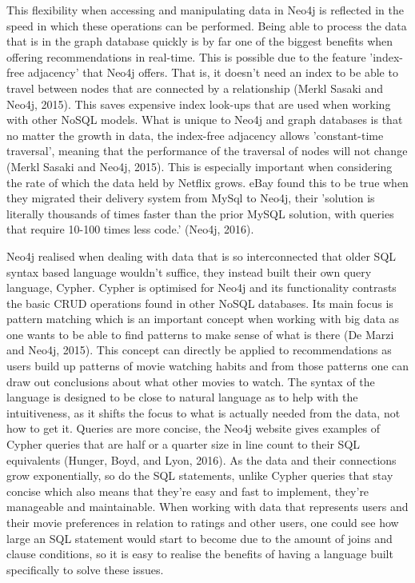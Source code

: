 \documentclass[a4paper]{article}
\begin{document}
This flexibility when accessing and manipulating data in Neo4j is reflected in the speed in which these operations can be performed. Being able to process the data that is in the graph database quickly is by far one of the biggest benefits when offering recommendations in real-time. This is possible due to the feature 'index-free adjacency' that Neo4j offers. That is, it doesn't need an index to be able to travel between nodes that are connected by a relationship (Merkl Sasaki and Neo4j, 2015). This saves expensive index look-ups that are used when working with other NoSQL models. What is unique to Neo4j and graph databases is that no matter the growth in data, the index-free adjacency allows 'constant-time traversal', meaning that the performance of the traversal of nodes will not change (Merkl Sasaki and Neo4j, 2015). This is especially important when considering the rate of which the data held by Netflix grows. eBay found this to be true when they migrated their delivery system from MySql to Neo4j, their 'solution is literally thousands of times faster than the prior MySQL solution, with queries that require 10-100 times less code.' (Neo4j, 2016). \par

Neo4j realised when dealing with data that is so interconnected that older SQL syntax based language wouldn't suffice, they instead built their own query language, Cypher. Cypher is optimised for Neo4j and its functionality contrasts the basic CRUD operations found in other NoSQL databases. Its main focus is pattern matching which is an important concept when working with big data as one wants to be able to find patterns to make sense of what is there (De Marzi and Neo4j, 2015). This concept can directly be applied to recommendations as users build up patterns of movie watching habits and from those patterns one can draw out conclusions about what other movies to watch. The syntax of the language is designed to be close to natural language as to help with the intuitiveness, as it shifts the focus to what is actually needed from the data, not how to get it. Queries are more concise, the Neo4j website gives examples of Cypher queries that are half or a quarter size in line count to their SQL equivalents (Hunger, Boyd, and Lyon, 2016). As the data and their connections grow exponentially, so do the SQL statements, unlike Cypher queries that stay concise which also means that they're easy and fast to implement, they're manageable and maintainable. When working with data that represents users and their movie preferences in relation to ratings and other users, one could see how large an SQL statement would start to become due to the amount of joins and clause conditions, so it is easy to realise the benefits of having a language built specifically to solve these issues. \par
\end{document}
